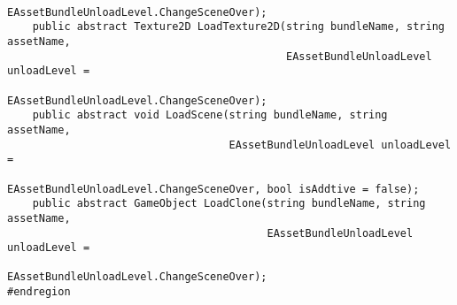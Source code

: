 \documentclass[9pt, b5paper]{article}
\begin{document}
\begin{itemize}
\begin{verbatim}
                                      EAssetBundleUnloadLevel.ChangeSceneOver);
    public abstract Texture2D LoadTexture2D(string bundleName, string assetName, 
                                            EAssetBundleUnloadLevel unloadLevel = 
                                            EAssetBundleUnloadLevel.ChangeSceneOver);
    public abstract void LoadScene(string bundleName, string assetName, 
                                   EAssetBundleUnloadLevel unloadLevel = 
                                   EAssetBundleUnloadLevel.ChangeSceneOver, bool isAddtive = false);
    public abstract GameObject LoadClone(string bundleName, string assetName, 
                                         EAssetBundleUnloadLevel unloadLevel = 
                                         EAssetBundleUnloadLevel.ChangeSceneOver);
#endregion


\end{verbatim}
\end{itemize}
\end{document}
